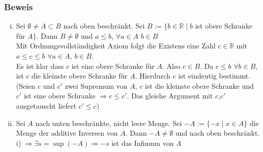 \subsubsection*{Beweis}
\begin{enumerate}[i)]
\item Sei $\emptyset\not=A\subset B$ nach oben beschränkt. Sei $B:=\{b\in\mathbb{R}\mid b$ ist obere Schranke für $A\}$. Dann $B\not=\emptyset$ und $a\leq b$, $\forall a\in A$ $b\in B$\\

Mit Ordnungsvollständigkeit Axiom folgt die Existens eine Zahl $c\in\mathbb{R}$ mit $a\leq c\leq b$ $\forall a\in A$, $b\in B$.\\

Es ist klar dass $c$ ist eine obere Schranke für $A$. Also $c\in B$. Da $c\leq b$ $\forall b\in B$, ist $c$ die kleinste obere Schranke für $A$. Hierdurch $c$ ist eindeutig bestimmt.\\

(Seien $c$ und $c'$ zwei Supremum von $A$, $c$ ist die kleinste obere Schranke und $c'$ ist eine obere Schranke $\Rightarrow c\leq c'$. Das gleiche Argument mit $c$,$c'$ ausgetauscht liefert $c'\leq c$)
\item Sei $A$ nach unten beschränkte, nicht leere Menge. Sei $-A:=\{ -x\mid x\in A\}$ die Menge der additive Inversen von $A$. Dann $-A\not=\emptyset$ und nach oben beschränkt. i) $\Rightarrow \exists s=\sup (-A)\Rightarrow -s$ ist das Infimum von $A$ 
\end{enumerate}

